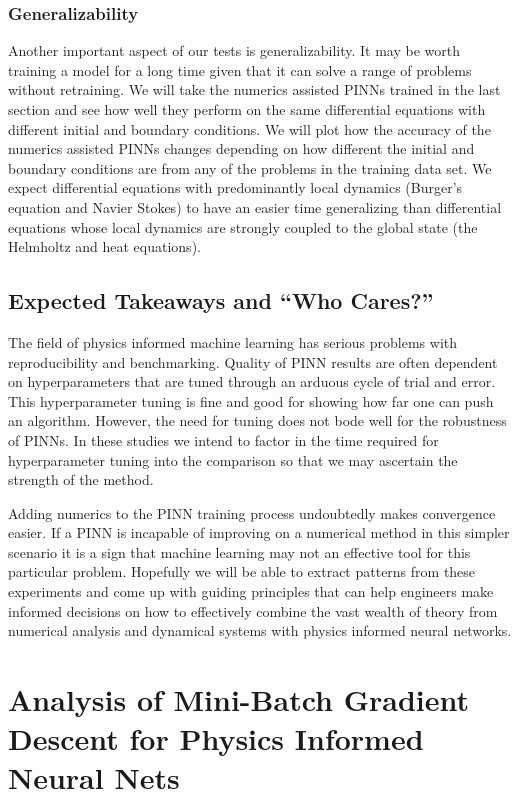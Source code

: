 \documentclass[12pt]{article}
\begin{document}
\subsubsection*{Generalizability}

Another important aspect of our tests is generalizability. It may be worth training a model for a long time given that it can solve a 
range of problems without retraining. We will take the numerics assisted PINNs trained in the last section
and see how well they perform on the same differential equations with different initial and boundary conditions. We will plot how the accuracy of
the numerics assisted PINNs changes depending on how different the initial and boundary conditions are from any of the problems in the training
data set. We expect differential equations with predominantly local dynamics (Burger's equation and Navier Stokes) to have an easier time generalizing than 
differential equations whose local dynamics are strongly coupled to the global state (the Helmholtz and heat equations).

\subsection{Expected Takeaways and ``Who Cares?''}

The field of physics informed machine learning has serious problems with reproducibility and benchmarking. 
Quality of PINN results are often dependent on hyperparameters that are tuned through an arduous cycle of trial and error.
This hyperparameter tuning is fine and good for showing how far one can push an algorithm. However, the need for tuning 
does not bode well for the robustness of PINNs. In these studies we intend to factor in the time required for hyperparameter tuning
into the comparison so that we may ascertain the strength of the method.

Adding numerics to the PINN training process undoubtedly makes convergence easier. If a PINN is incapable of improving
on a numerical method in this simpler scenario it is a sign that machine learning may not an effective tool for this particular
problem. Hopefully we will be able to extract patterns from these experiments and come up with guiding principles that can help
engineers make informed decisions on how to effectively combine the vast wealth of theory from numerical analysis 
and dynamical systems with physics informed neural networks.

\section{Analysis of Mini-Batch Gradient Descent for Physics Informed Neural Nets}
\end{document}
